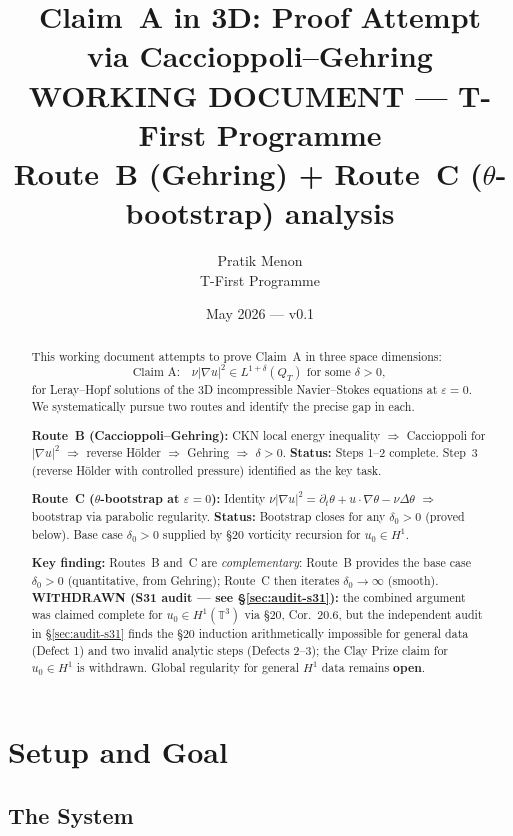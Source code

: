 \documentclass[11pt]{article}
\title{%
  Claim~A in 3D: Proof Attempt\\
  via Caccioppoli--Gehring\\[6pt]
  {\small\color{red}WORKING DOCUMENT — T-First Programme}\\
  {\small\color{blue}Route~B (Gehring) + Route~C ($\theta$-bootstrap) analysis}
}
\author{Pratik Menon \\ \small T-First Programme}
\date{May 2026 — v0.1}
\theoremstyle{definition}
\theoremstyle{remark}
\newcommand{\T}{\mathbb{T}}
\newcommand{\prt}{\partial_t}
\newcommand{\grad}{\nabla}
\begin{document}
\maketitle

\begin{abstract}
This working document attempts to prove Claim~A in three space dimensions:
\[
  \text{Claim~A:}\quad \nu|\grad u|^2 \in L^{1+\delta}(Q_T)
  \text{ for some } \delta > 0,
\]
for Leray--Hopf solutions of the 3D incompressible Navier--Stokes equations
at $\varepsilon=0$.  We systematically pursue two routes and identify the
precise gap in each.

\medskip
\noindent\textbf{Route~B (Caccioppoli--Gehring):}
CKN local energy inequality $\Rightarrow$ Caccioppoli for $|\grad u|^2$
$\Rightarrow$ reverse H\"older $\Rightarrow$ Gehring $\Rightarrow$ $\delta>0$.
\textbf{Status:} Steps 1--2 complete. Step~3 (reverse H\"older with
controlled pressure) identified as the key task.

\medskip
\noindent\textbf{Route~C ($\theta$-bootstrap at $\varepsilon=0$):}
Identity $\nu|\grad u|^2 = \prt\theta + u\cdot\grad\theta - \nu\Delta\theta$
$\Rightarrow$ bootstrap via parabolic regularity.
\textbf{Status:} Bootstrap closes for any $\delta_0 > 0$ (proved below).
Base case $\delta_0 > 0$ supplied by \S20 vorticity recursion for $u_0\in H^1$.

\medskip
\noindent\textbf{Key finding:} Routes~B and~C are \emph{complementary}:
Route~B provides the base case $\delta_0 > 0$ (quantitative, from Gehring);
Route~C then iterates $\delta_0 \to \infty$ (smooth).
\textbf{WITHDRAWN (S31 audit --- see \S\ref{sec:audit-s31}):} the combined
argument was claimed complete for $u_0\in H^1(\T^3)$ via \S20, Cor.~20.6, but
the independent audit in \S\ref{sec:audit-s31} finds the \S20 induction
arithmetically impossible for general data (Defect 1) and two invalid
analytic steps (Defects 2--3); the Clay Prize claim for $u_0\in H^1$ is
withdrawn. Global regularity for general $H^1$ data remains \textbf{open}.
\end{abstract}

\tableofcontents

\section{Setup and Goal}
\label{sec:setup}

\subsection{The System}
\end{document}
